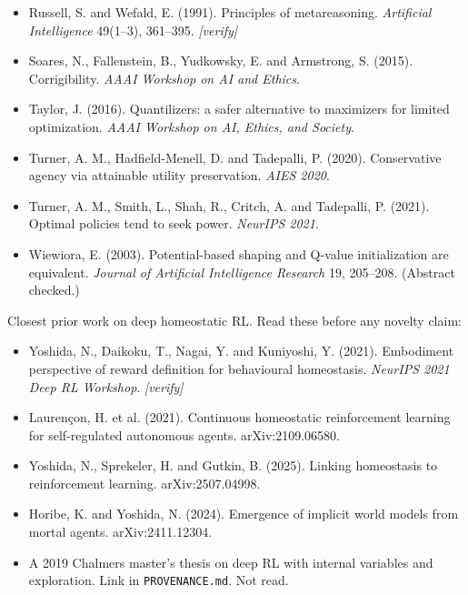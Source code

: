 \documentclass[11pt]{article}
\begin{document}
\begin{itemize}
\item Russell, S. and Wefald, E. (1991). Principles of metareasoning. \textit{Artificial Intelligence} 49(1--3), 361--395. \textit{[verify]}
\item Soares, N., Fallenstein, B., Yudkowsky, E. and Armstrong, S. (2015). Corrigibility. \textit{AAAI Workshop on AI and Ethics}.
\item Taylor, J. (2016). Quantilizers: a safer alternative to maximizers for limited optimization. \textit{AAAI Workshop on AI, Ethics, and Society}.
\item Turner, A. M., Hadfield-Menell, D. and Tadepalli, P. (2020). Conservative agency via attainable utility preservation. \textit{AIES 2020}.
\item Turner, A. M., Smith, L., Shah, R., Critch, A. and Tadepalli, P. (2021). Optimal policies tend to seek power. \textit{NeurIPS 2021}.
\item Wiewiora, E. (2003). Potential-based shaping and Q-value initialization are equivalent. \textit{Journal of Artificial Intelligence Research} 19, 205--208. (Abstract checked.)
\end{itemize}

Closest prior work on deep homeostatic RL. Read these before any novelty claim:

\begin{itemize}
\item Yoshida, N., Daikoku, T., Nagai, Y. and Kuniyoshi, Y. (2021). Embodiment perspective of reward definition for behavioural homeostasis. \textit{NeurIPS 2021 Deep RL Workshop}. \textit{[verify]}
\item Laurençon, H. et al. (2021). Continuous homeostatic reinforcement learning for self-regulated autonomous agents. arXiv:2109.06580.
\item Yoshida, N., Sprekeler, H. and Gutkin, B. (2025). Linking homeostasis to reinforcement learning. arXiv:2507.04998.
\item Horibe, K. and Yoshida, N. (2024). Emergence of implicit world models from mortal agents. arXiv:2411.12304.
\item A 2019 Chalmers master's thesis on deep RL with internal variables and exploration. Link in \texttt{PROVENANCE.md}. Not read.
\end{itemize}
\end{document}

